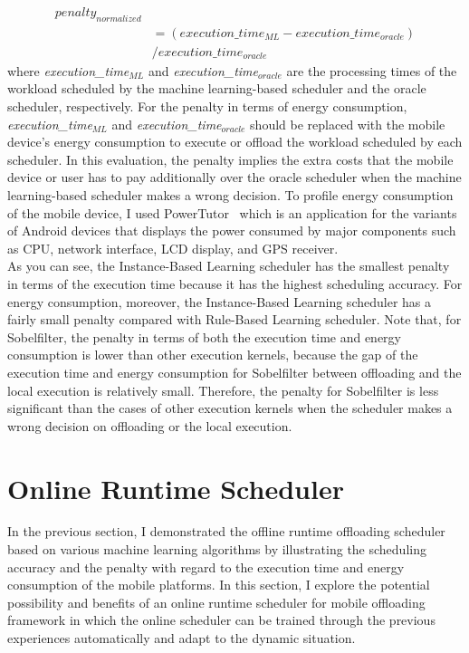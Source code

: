 %
\begin{equation}
\begin{split}
	penalty_{normalized} \\ 
		&	= (execution\_time_{ML} 
               - execution\_time_{oracle}) \\
        &        / execution\_time_{oracle}
\end{split}
\label{equ:penalty}
\end{equation}
%
where {\it execution\_time$_{ML}$} and 
{\it execution\_time$_{oracle}$} are the processing times 
of the workload scheduled by the machine learning-based scheduler 
and the oracle scheduler, respectively.
%
For the penalty in terms of energy consumption, 
{\it execution\_time$_{ML}$} and {\it execution\_time$_{oracle}$}
should be replaced with the mobile device's energy consumption to 
execute or offload the workload scheduled by each scheduler.
%
In this evaluation, the penalty implies the extra costs that the mobile
device or user has to pay additionally over the oracle scheduler when
the machine learning-based scheduler makes a wrong decision. 
%
To profile energy consumption of the mobile device, I used
PowerTutor~\cite{powertutor} which is an application for the variants of
Android devices that displays the power consumed by major components
such as CPU, network interface, LCD display, and GPS receiver.\\
%
As you can see, the Instance-Based Learning scheduler has the smallest
penalty in terms of the execution time because it has the highest
scheduling accuracy.
%
For energy consumption, moreover, the Instance-Based Learning scheduler has
a fairly small penalty compared with Rule-Based Learning scheduler.
%  
Note that, for Sobelfilter, the penalty in terms of both the execution
time and energy consumption is lower than other execution kernels,
because the gap of the execution time and energy consumption for
Sobelfilter between offloading and the local execution is relatively
small.
%
Therefore, the penalty for Sobelfilter is less significant than the
cases of other execution kernels when the scheduler makes a wrong
decision on offloading or the local execution.
%

\section{Online Runtime Scheduler}
\label{scheduler:online}
%
In the previous section, I demonstrated the offline runtime offloading
scheduler based on various machine learning algorithms by illustrating
the scheduling accuracy and the penalty with regard to the execution
time and energy consumption of the mobile platforms.
%
In this section, I explore the potential possibility and benefits of an
online runtime scheduler for mobile offloading framework in which
the online scheduler can be trained through the previous experiences
automatically and adapt to the dynamic situation.
%
